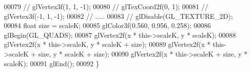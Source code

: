 \begin{DoxyCode}
00079   \textcolor{comment}{//  glVertex3f(1, 1, -1);}
00080   \textcolor{comment}{//  glTexCoord2f(0, 1);}
00081   \textcolor{comment}{//  glVertex3f(-1, 1, -1);}
00082   \textcolor{comment}{// .....}
00083   \textcolor{comment}{//  glDisable(GL\_TEXTURE\_2D);}
00084   \textcolor{keywordtype}{float} size = scaleK;
00085   glColor3f(0.560, 0.956, 0.258);
00086   glBegin(GL\_QUADS);
00087   glVertex2f(x * \textcolor{keyword}{this}->scaleK, y * scaleK);
00088   glVertex2f(x * \textcolor{keyword}{this}->scaleK, y * scaleK + size);
00089   glVertex2f(x * \textcolor{keyword}{this}->scaleK + size, y * scaleK + size);
00090   glVertex2f(x * \textcolor{keyword}{this}->scaleK + size, y * scaleK);
00091   glEnd();
00092 \}
\end{DoxyCode}
